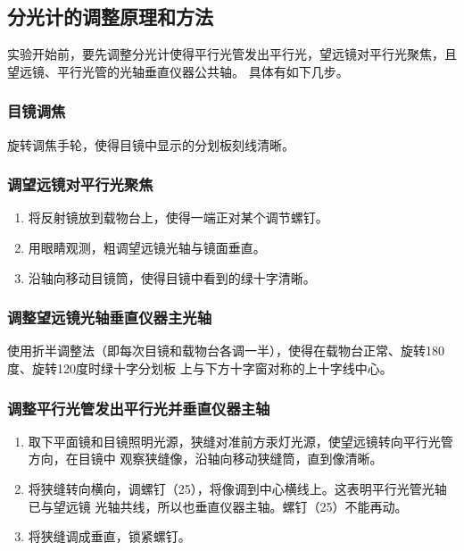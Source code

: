 \documentclass[UTF8]{ctexart}
\begin{document}
\subsection{分光计的调整原理和方法}
实验开始前，要先调整分光计使得平行光管发出平行光，望远镜对平行光聚焦，且望远镜、平行光管的光轴垂直仪器公共轴。
具体有如下几步。
\subsubsection{目镜调焦}
旋转调焦手轮，使得目镜中显示的分划板刻线清晰。
\subsubsection{调望远镜对平行光聚焦}
\begin{enumerate}
    \item 将反射镜放到载物台上，使得一端正对某个调节螺钉。\
    \item 用眼睛观测，粗调望远镜光轴与镜面垂直。
    \item 沿轴向移动目镜筒，使得目镜中看到的绿十字清晰。
\end{enumerate}
\subsubsection{调整望远镜光轴垂直仪器主光轴}
使用折半调整法（即每次目镜和载物台各调一半），使得在载物台正常、旋转180度、旋转120度时绿十字分划板
上与下方十字窗对称的上十字线中心。
\subsubsection{调整平行光管发出平行光并垂直仪器主轴}
\begin{enumerate}
    \item 取下平面镜和目镜照明光源，狭缝对准前方汞灯光源，使望远镜转向平行光管方向，在目镜中
    观察狭缝像，沿轴向移动狭缝筒，直到像清晰。
    \item 将狭缝转向横向，调螺钉（25），将像调到中心横线上。这表明平行光管光轴已与望远镜
    光轴共线，所以也垂直仪器主轴。螺钉（25）不能再动。
    \item 将狭缝调成垂直，锁紧螺钉。
\end{enumerate}
\end{document}
